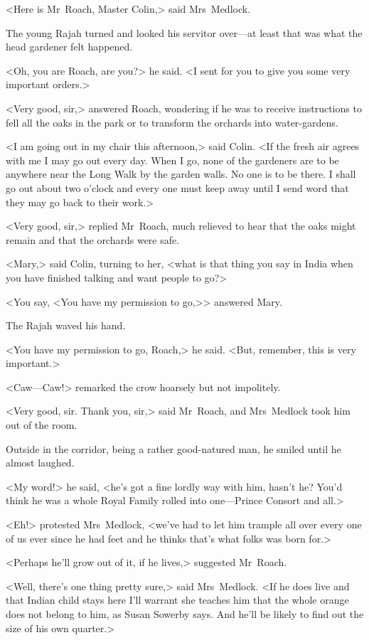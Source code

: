 <Here is Mr~Roach, Master Colin,> said Mrs~Medlock.

The young Rajah turned and looked his servitor over—at least that was what the head gardener felt happened.

<Oh, you are Roach, are you?> he said. <I sent for you to give you some very important orders.>

<Very good, sir,> answered Roach, wondering if he was to receive instructions to fell all the oaks in the park or to transform the orchards into water-gardens.

<I am going out in my chair this afternoon,> said Colin. <If the fresh air agrees with me I may go out every day. When I go, none of the gardeners are to be anywhere near the Long Walk by the garden walls. No one is to be there. I shall go out about two o'clock and every one must keep away until I send word that they may go back to their work.>

<Very good, sir,> replied Mr~Roach, much relieved to hear that the oaks might remain and that the orchards were safe.

<Mary,> said Colin, turning to her, <what is that thing you say in India when you have finished talking and want people to go?>

<You say, <You have my permission to go,>> answered Mary.

The Rajah waved his hand.

<You have my permission to go, Roach,> he said. <But, remember, this is very important.>

<Caw—Caw!> remarked the crow hoarsely but not impolitely.

<Very good, sir. Thank you, sir,> said Mr~Roach, and Mrs~Medlock took him out of the room.

Outside in the corridor, being a rather good-natured man, he smiled until he almost laughed.

<My word!> he said, <he's got a fine lordly way with him, hasn't he? You'd think he was a whole Royal Family rolled into one—Prince Consort and all.>

<Eh!> protested Mrs~Medlock, <we've had to let him trample all over every one of us ever since he had feet and he thinks that's what folks was born for.>

<Perhaps he'll grow out of it, if he lives,> suggested Mr~Roach.

<Well, there's one thing pretty sure,> said Mrs~Medlock. <If he does live and that Indian child stays here I'll warrant she teaches him that the whole orange does not belong to him, as Susan Sowerby says. And he'll be likely to find out the size of his own quarter.>

